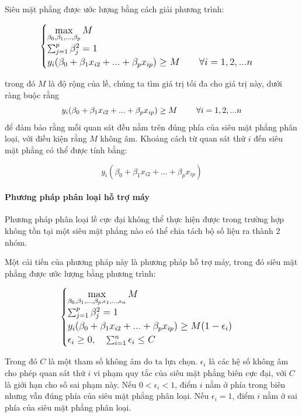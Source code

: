 Siêu mặt phẳng được ước lượng bằng cách giải phương trình:


 $$
\large
\begin{cases}
\max\limits_{\beta_0, \beta_1,...,\beta_p}M\\

\sum_{j = 1}^p \beta_j^2 = 1\\

y_i(\beta_0 + \beta_1x_{i2} + ... + \beta_px_{ip}) \geq M \qquad \forall i = 1, 2, ...n
\end{cases}
$$

trong đó $M$ là độ rộng của lề, chúng ta tìm giá trị tối đa cho giá trị này, dưới ràng buộc rằng 
 $$
\large
y_i(\beta_0 + \beta_1x_{i2} + ... + \beta_px_{ip}) \geq M \qquad \forall i = 1, 2, ...n
$$
để đảm bảo rằng mỗi quan sát đều nằm trên đúng phía của siêu mặt phẳng phân loại, với điều kiện rằng $M$ không âm.
Khoảng cách từ quan sát thứ $i$ đến siêu mặt phẳng có thể được tính bằng: 

$$
y_i(\beta_0 + \beta_1x_{i2} + ... + \beta_px_{ip})
$$


\paragraph{Phương pháp phân loại hỗ trợ máy}

Phương pháp phân loại lề cực đại không thể thực hiện được trong trường hợp không tồn tại một siêu mặt phẳng nào có thể chia tách bộ số liệu ra thành 2 nhóm.

Một cải tiến của phương pháp này là phương pháp hỗ trợ máy, trong đó siêu mặt phẳng được ước lượng bằng phương trình:

$$
\large
\begin{cases}
\max\limits_{\beta_0, \beta_1,...,\beta_p, \epsilon_1, ... , \epsilon_n}M\\

\sum_{j = 1}^p \beta_j^2 = 1\\

y_i(\beta_0 + \beta_1x_{i2} + ... + \beta_px_{ip}) \geq M(1-\epsilon_i) \\

\epsilon_i \geq 0, \quad \sum_{i = 1}^n \epsilon_i \leq C
\end{cases}
$$

Trong đó $C$ là một tham số không âm do ta lựa chọn. $\epsilon_i$ là các hệ số không âm cho phép quan sát thứ $i$ vi phạm quy tắc của siêu mặt phẳng biên cực đại, với $C$ là giới hạn cho số sai phạm này. Nếu $0 < \epsilon_i < 1$, điểm $i$ nằm ở phía trong biên nhưng vẫn đúng phía của siêu mặt phẳng phân loại. Nếu $\epsilon_i = 1$, điểm $i$ nằm ở sai phía của siêu mặt phẳng phân loại.

